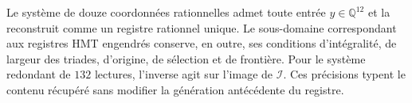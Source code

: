 Le système de douze coordonnées rationnelles admet toute entrée
$y\in\mathbb Q^{12}$ et la reconstruit comme un registre rationnel
unique. Le sous-domaine correspondant aux registres HMT engendrés
conserve, en outre, ses conditions d'intégralité, de largeur des
triades, d'origine, de sélection et de frontière. Pour le système redondant de
$132$ lectures, l'inverse agit sur l'image de $\mathcal I$.
Ces précisions typent le contenu récupéré sans modifier la
génération antécédente du registre.
